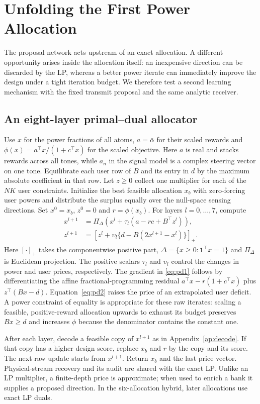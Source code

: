 \section{Unfolding the First Power Allocation}
The proposal network acts upstream of an exact allocation. A different opportunity arises inside the allocation itself: an inexpensive direction can be discarded by the LP, whereas a better power iterate can immediately improve the design under a tight iteration budget. We therefore test a second learning mechanism with the fixed transmit proposal and the same analytic receiver.

\subsection{An eight-layer primal--dual allocator}
Use $x$ for the power fractions of all atoms, $a=\bar\alpha$ for their scaled rewards and $\phi(x)=a^\top x/(1+c^\top x)$ for the scaled objective. Here $a$ is real and stacks rewards across all tones, while $a_n$ in the signal model is a complex steering vector on one tone. Equilibrate each user row of $B$ and its entry in $d$ by the maximum absolute coefficient in that row. Let $z\ge0$ collect one multiplier for each of the $NK$ user constraints. Initialize the best feasible allocation $x_b$ with zero-forcing user powers and distribute the surplus equally over the null-space sensing directions. Set $x^0=x_b$, $z^0=0$ and $r=\phi(x_b)$. For layers $l=0,\ldots,7$, compute
\begin{align}
 x^{l+1}&=\Pi_{\Delta}\!\left(x^l+\tau_l(a-r c+B^\top z^l)\right),\label{eq:pd1}\\
 z^{l+1}&=\left[z^l+\upsilon_l\{d-B(2x^{l+1}-x^l)\}\right]_+ .
 \label{eq:pd2}
\end{align}
Here $[\cdot]_+$ takes the componentwise positive part, $\Delta=\{x\ge0:\mathbf1^\top x=1\}$ and $\Pi_\Delta$ is Euclidean projection. The positive scalars $\tau_l$ and $\upsilon_l$ control the changes in power and user prices, respectively. The gradient in \eqref{eq:pd1} follows by differentiating the affine fractional-programming residual $a^\top x-r(1+c^\top x)$ plus $z^\top(Bx-d)$. Equation~\eqref{eq:pd2} raises the price of an extrapolated user deficit. A power constraint of equality is appropriate for these raw iterates: scaling a feasible, positive-reward allocation upwards to exhaust its budget preserves $Bx\ge d$ and increases $\phi$ because the denominator contains the constant one.

After each layer, decode a feasible copy of $x^{l+1}$ as in Appendix~\ref{ap:decode}. If that copy has a higher design score, replace $x_b$ and $r$ by the copy and its score. The next raw update starts from $x^{l+1}$. Return $x_b$ and the last price vector. Physical-stream recovery and its audit are shared with the exact LP. Unlike an LP multiplier, a finite-depth price is approximate; when used to enrich a bank it supplies a proposed direction. In the six-allocation hybrid, later allocations use exact LP duals.

